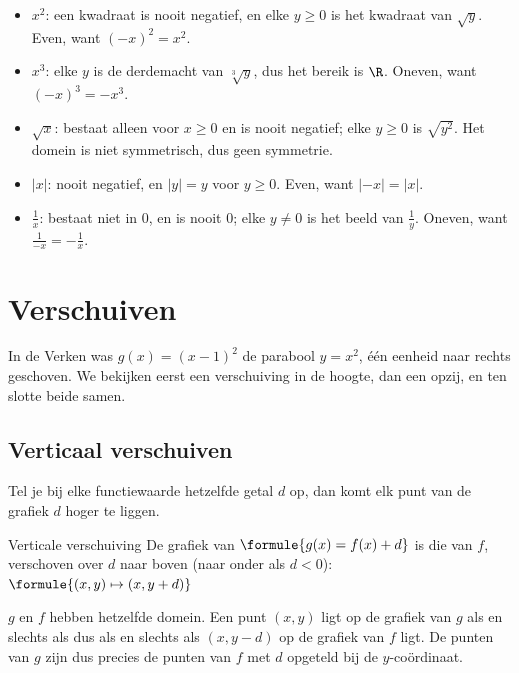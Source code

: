 \begin{itemize}
\item $x^2$: een kwadraat is nooit negatief, en elke $y \geqslant 0$ is het kwadraat van $\sqrt{y}$. Even, want $(-x)^2 = x^2$.
\item $x^3$: elke $y$ is de derdemacht van $\sqrt[3]{y}$, dus het bereik is $\R$. Oneven, want $(-x)^3 = -x^3$.
\item $\sqrt{x}$: bestaat alleen voor $x \geqslant 0$ en is nooit negatief; elke $y \geqslant 0$ is $\sqrt{y^2}$. Het domein is niet symmetrisch, dus geen symmetrie.
\item $|x|$: nooit negatief, en $|y| = y$ voor $y \geqslant 0$. Even, want $|-x| = |x|$.
\item $\frac1x$: bestaat niet in $0$, en is nooit $0$; elke $y \neq 0$ is het beeld van $\frac1y$. Oneven, want $\frac{1}{-x} = -\frac1x$.
\end{itemize}

\begin{oefeningen}
\end{oefeningen}

\section{Verschuiven}

In de Verken was $g(x) = (x - 1)^2$ de parabool $y = x^2$, één eenheid naar rechts geschoven. We bekijken eerst een verschuiving in de hoogte, dan een opzij, en ten slotte beide samen.

\subsection{Verticaal verschuiven}

Tel je bij elke functiewaarde hetzelfde getal $d$ op, dan komt elk punt van de grafiek $d$ hoger te liggen.

\begin{theorie}
\begin{stelling}{Verticale verschuiving}
De grafiek van $\formule{g(x) = f(x) + d}$ is die van $f$, verschoven over $d$ naar boven (naar onder als $d < 0$): \quad $\formule{(x, y) \mapsto (x, y + d)}$
\end{stelling}

\begin{bewijs}
$g$ en $f$ hebben hetzelfde domein. Een punt $(x, y)$ ligt op de grafiek van $g$ als en slechts als
dus als en slechts als $(x, y - d)$ op de grafiek van $f$ ligt. De punten van $g$ zijn dus precies de punten van $f$ met $d$ opgeteld bij de $y$-coördinaat.
\end{bewijs}
\end{theorie}

